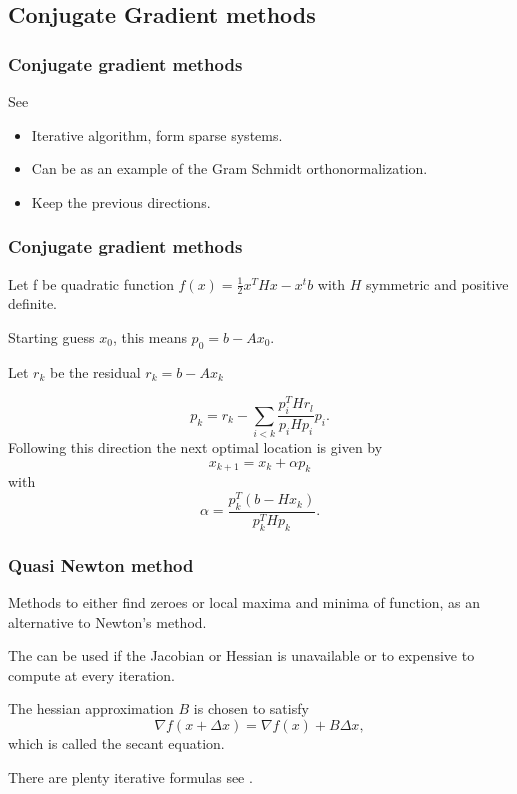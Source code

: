 \subsection{Conjugate Gradient methods}

\begin{frame}
  \frametitle{Conjugate gradient methods}
  See \cite{ConjugateGradientMethod}
  \begin{itemize}
    \item Iterative algorithm, form sparse systems. 
    \item Can be as an example of the Gram Schmidt orthonormalization. 
    \item Keep the previous directions. 
  \end{itemize}

\end{frame}

\begin{frame}
  \frametitle{Conjugate gradient methods}
  Let f be quadratic function 
  $f(x) = \frac{1}{2}x^T H x - x^t b$
 with $H$ symmetric and positive definite. 

 Starting guess $x_0$,
 this means $p_0 = b - Ax_0$. 

 Let $r_k$ be the residual
 $r_k = b - Ax_k$

 \begin{equation}
  p_k = r_k - \sum_{i < k} \frac{p_i^T H r_l}{p_i H p_i}p_i.
 \end{equation}
 Following this direction the next optimal location 
 is given by 
\begin{equation}
  x_{k+1}
  =
  x_k + \alpha p_k
\end{equation} 
with 
\begin{equation}
  \alpha
  =
  \frac{p_k^T (b - H x_k)}{p_k^T H p_k}.
\end{equation}
\end{frame}

\begin{frame}
  \frametitle{Quasi Newton method}

Methods to either find zeroes or local maxima and
minima of function, as an alternative to 
Newton's method. 

The can be used if the Jacobian or Hessian is unavailable
or to expensive to compute at every iteration. 

The hessian approximation $B$ is chosen 
to satisfy
\begin{equation}
  \nabla f(x + \Delta x)
  = 
  \nabla f(x ) + B \Delta x,
\end{equation}
which is called the secant equation. 

There are plenty iterative formulas see
\cite{Quasi-NewtonMethod}. 

\end{frame}

